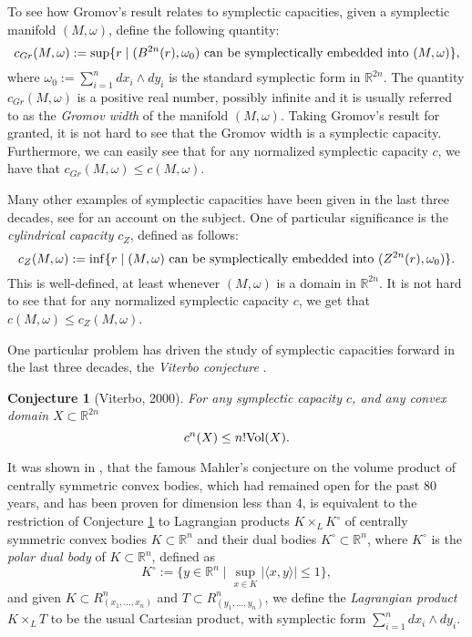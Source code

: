 \documentclass{article}
\newtheorem{conj}[theorem]{Conjecture}
\theoremstyle{definition}
\begin{document}
To see how Gromov's result relates to symplectic capacities, given a symplectic manifold $(M,\omega)$, define the following quantity:
$$c_{Gr}(M,\omega):=\sup\{r\mid (B^{2n}(r),\omega_0) \textup{ can be symplectically embedded into }(M,\omega)\},$$
where $\omega_0:=\sum_{i=1}^{n}dx_i\wedge dy_i$ is the standard symplectic form in $\mathbb{R}^{2n}$. The quantity $c_{Gr}(M,\omega)$ is a positive real number, possibly infinite and it is usually referred to as the \textit{Gromov width} of the manifold $(M,\omega)$. Taking Gromov's result for granted, it is not hard to see that the Gromov width is a symplectic capacity. Furthermore, we can easily see that for any normalized symplectic capacity $c$, we have that $c_{Gr}(M,\omega)\leq c(M,\omega)$. 

Many other examples of symplectic capacities have been given in the last three decades, see \cite{Cieliebak2005QuantitativeSG} for an account on the subject. One of particular significance is the \textit{cylindrical capacity} $c_Z$, defined as follows:
$$c_Z(M,\omega):=\inf\{r\mid (M,\omega) \textup{ can be symplectically embedded into } (Z^{2n}(r),\omega_0)\}.$$
This is well-defined, at least whenever $(M,\omega)$ is a domain in $\mathbb{R}^{2n}$. It is not hard to see that for any normalized symplectic capacity $c$, we get that $c(M,\omega)\leq c_Z(M,\omega)$.

One particular problem has driven the study of symplectic capacities forward in the last three decades, the \textit{Viterbo conjecture} \cite{Viterbo2000MetricAI}. 

\begin{conj}[Viterbo, 2000]\label{conj: viterbo}
For any symplectic capacity $c$, and any convex
domain $X \subset \mathbb{R}^{2n}$
$$c^n(X) \leq n!\textup{Vol}(X).$$
\end{conj}

It was shown in \cite{ArtsteinAvidan2013FromSM}, that the famous Mahler’s conjecture on the volume
product of centrally symmetric convex bodies, which had remained open for the
past 80 years, and has been proven for dimension less than 4, is equivalent to
the restriction of Conjecture \ref{conj: viterbo} to Lagrangian products $K\times_L K^{\circ}$ of centrally symmetric
convex bodies $K \subset\mathbb{R}^n$ and their dual bodies $K^{\circ} \subset \mathbb{R}^n$, where $K^{\circ}$ is the \textit{polar dual body} of $K\subset \mathbb{R}^n$, defined as
$$K^{\circ}:=\{y\in \mathbb{R}^n\mid\sup_{x\in K} |\langle x,y\rangle|\leq 1\},$$
and given $K\subset{R}^n_{(x_1,\ldots,x_n)}$ and $T\subset{R}^n_{(y_1,\ldots,y_n)}$, we define the \textit{Lagrangian product} $K\times_L T$ to be the usual Cartesian product, with symplectic form $\sum_{i=1}^ndx_i\wedge dy_i$.
\end{document}
